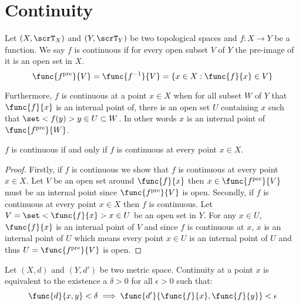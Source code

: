 \section{Continuity}
\begin{definition} [Continuity]
    Let \((X,\scrT_X)\) and \((Y,\scrT_Y)\) be two topological spaces and \(f : X \to Y\) be a function. We say \(f\) is continuous if for every open subset \(V\) of \(Y\) the pre-image of it is an open set in \(X\).
    \begin{equation*} 
        \func{f^{\mathrm{pre}}}{V}= \func{f^{-1}}{V} = \{ x \in X : \func{f}{x} \in V\}
    \end{equation*}

    Furthermore, \(f\) is continuous at a point \(x \in X\) when for all subset \(W\) of  \(Y\) that \( \func{f}{x} \) is an internal point of, there is an open set \(U\) containing \(x\) such that \(\set<f(y)> {y \in U }\subset W\). In other words \(x\) is an internal point of \(\func{f^{\mathrm{pre}}}{W}\).
\end{definition}

\begin{proposition}
    \(f\) is continuous if and only if \(f\) is continuous at every point \(x \in X\).
\end{proposition}

\begin{proof}
    Firstly, if \(f\) is continuous we show that \(f\) is continuous at every point \(x \in X\). Let \(V\) be an open set around \( \func{f}{x}\) then \(x \in \func{f^{\mathrm{pre}}}{V}\) must be an internal point since \(\func{f^{\mathrm{pre}}}{V}\) is open.
    Secondly, if \(f\) is continuous at every point \(x \in X\) then \(f\) is continuous. Let \(V = \set<\func{f}{x} >{ x \in U}\) be an open set in \(Y\). For any \(x \in U\), \(\func{f}{x}\) is an internal point of \(V\) and since \(f\) is continuous at \(x\), \(x\) is an internal point of \(U\) which means every point \(x \in U\) is an internal point of \(U\) and thus \(U = \func{f^{\mathrm{pre}}}{V}\) is open.
\end{proof}

\begin{theorem} 
    Let \((X,d)\) and \((Y,d')\) be two metric space. Continuity at a point \(x\) is equivalent to the existence a \(\delta > 0\) for all \(\epsilon > 0\) such that:
    \begin{equation*}
        \func{d}{x,y} < \delta \implies \func{d'}{\func{f}{x},\func{f}{y}} < \epsilon  
    \end{equation*}
\end{theorem}


